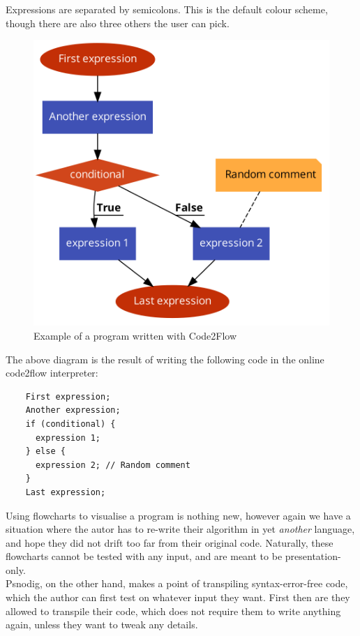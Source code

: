 Expressions are separated by semicolons. This is the default colour scheme, though there are also three others the user can pick.

\begin{figure}[ht]
    \centering
    \includegraphics[scale=0.2]{assets/code2flow_example.png}
    \caption{Example of a program written with Code2Flow}
    \label{fig:code2flow}
\end{figure}

The above diagram is the result of writing the following code in the online code2flow interpreter:

\begin{lstlisting}
    First expression;
    Another expression;
    if (conditional) {
      expression 1;
    } else {
      expression 2; // Random comment
    }
    Last expression;
\end{lstlisting}

Using flowcharts to visualise a program is nothing new, however again we have a situation where the autor has to re-write their algorithm in yet \textit{another} language, and hope they did not drift too far from their original code. Naturally, these flowcharts cannot be tested with any input, and are meant to be presentation-only. \hfill \\

Psnodig, on the other hand, makes a point of transpiling syntax-error-free code, which the author can first test on whatever input they want. First then are they allowed to transpile their code, which does not require them to write anything again, unless they want to tweak any details.